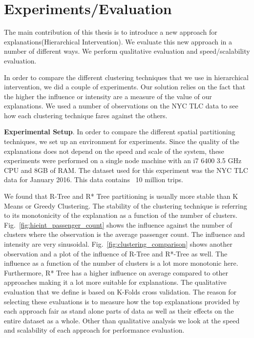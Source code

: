 \chapter{Experiments/Evaluation}
\label{chp:eval}
\label{sec:evaluation}
The main contribution of this thesis is to introduce a new approach for explanations(Hierarchical Intervention). We evaluate this new approach in a number of different ways. We perform qualitative evaluation and speed/scalability evaluation.

In order to compare the different clustering techniques that we use in hierarchical intervention, we did a couple of experiments. Our solution relies on the fact that the higher the influence or intensity are a measure of the value of our explanations. We used a number of observations on the NYC TLC data to see how each clustering technique fares against the others.

\textbf{Experimental Setup}. In order to compare the different spatial partitioning techniques, we set up an environment for experiments. Since the quality of the explanations does not depend on the speed and scale of the system, these experiments were performed on a single node machine with an i7 6400 3.5 GHz CPU and 8GB of RAM. The dataset used for this experiment was the NYC TLC data for January 2016. This data contains ~10 million trips.

We found that R-Tree and R* Tree partitioning is usually more stable than K Means or Greedy Clustering. The stability of the clustering technique is referring to its monotonicity of the explanation as a function of the number of clusters. Fig.~\ref{fig:hieint_passenger_count} shows the influence against the number of clusters where the observation is the average passenger count. The influence and intensity are very sinusoidal. Fig.~\ref{fig:clustering_comparison} shows another observation and a plot of the influence of R-Tree and R*-Tree as well. The influence as a function of the number of clusters is a lot more monotonic here. Furthermore, R* Tree has a higher influence on average compared to other approaches making it a lot more suitable for explanations.
The qualitative evaluation that we define is based on K-Folds cross validation. The reason for selecting these evaluations is to measure how the top explanations provided by each approach fair as stand alone parts of data as well as their effects on the entire dataset as a whole. Other than qualitative analysis we look at the speed and scalability of each approach for performance evaluation.

